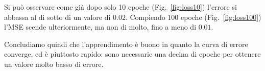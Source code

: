 \documentclass[a4paper,12pt]{article}
\begin{document}
Si può osservare come già dopo solo 10 epoche (Fig.~\vref{fig:loss10}) l'errore si abbassa al di sotto di un valore di $0.02$. Compiendo 100 epoche (Fig.~\vref{fig:loss100}) l'MSE scende ulteriormente, ma non di molto, fino a meno di $0.01$.

Concludiamo quindi che l'apprendimento è buono in quanto la curva di errore converge, ed è piuttosto rapido: sono necessarie una decina di epoche per ottenere un valore molto basso di errore.
\end{document}
